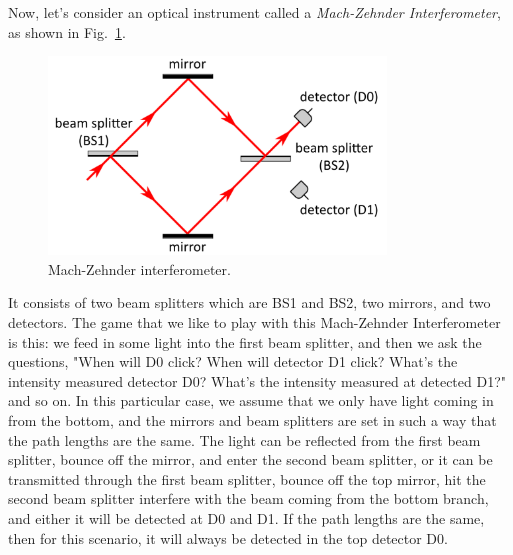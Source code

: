 Now, let's consider an optical instrument called a \emph{Mach-Zehnder Interferometer}, as shown in Fig.~\ref{fig:mach-zehnder}.
\begin{figure}[H]
   \centering
    \includegraphics[width=0.8\textwidth]{lesson6/mach_zehnder.pdf}
    
        \caption{Mach-Zehnder interferometer.}
    \label{fig:mach-zehnder}
    
\end{figure}
It consists of two beam splitters which are BS1 and BS2, two mirrors, and two detectors.  The game that we like to play with this Mach-Zehnder Interferometer is this: we feed in some light into the first beam splitter, and then we ask the questions, "When will D0 click?  When will detector D1 click? What's the intensity measured detector D0? What's the intensity measured at detected D1?" and so on. In this particular case, we assume that we only have light coming in from the bottom, and the mirrors and beam splitters are set in such a way that the path lengths are the same. The light can be reflected from the first beam splitter, bounce off the mirror, and enter the second beam splitter, or it can be transmitted through the first beam splitter, bounce off the top mirror, hit the second beam splitter interfere with the beam coming from the bottom branch, and either it will be detected at D0 and D1. If the path lengths are the same, then for this scenario, it will always be detected in the top detector D0.

